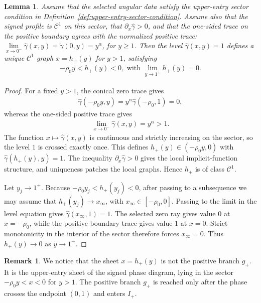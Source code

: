 \documentclass{amsart}
\theoremstyle{plain}
\newtheorem{lemma}[theorem]{Lemma}
\theoremstyle{mainintrothm}
\theoremstyle{definition}
\newtheorem{remark}[theorem]{Remark}
\begin{document}
\begin{lemma}
	\label{lem:upper-entry-sheet-from-zero-sector}
	Assume that the selected angular data satisfy the upper-entry sector
	condition in Definition~\ref{def:upper-entry-sector-condition}.  Assume also that the signed profile is $\mathcal C^1$ on this
	sector, that $\partial_x\widehat\gamma>0$, and that the one-sided trace on
	the positive boundary agrees with the normalized positive trace: $\lim\limits_{x\to0^-}\widehat\gamma(x,y)=\widetilde\gamma(0,y)=y^\alpha$, for  $y\ge1$. Then the level $\widehat\gamma(x,y)=1$ defines a unique
	$\mathcal C^1$ graph $x=h_+(y)$ for $y>1$, satisfying
	\begin{align*}
		-\rho_0y<h_+(y)<0,
		\mbox{ with }
		\lim\limits_{y\to1^+}h_+(y)=0.
	\end{align*}
\end{lemma}

\begin{proof}
	For a fixed $y>1$, the conical zero trace gives
	\begin{align*}
		\widehat\gamma(-\rho_0y,y)
		=
		y^\alpha\widehat\gamma(-\rho_0,1)
		=
		0,
	\end{align*}
	whereas the one-sided positive trace gives
	\begin{align*}
		\lim\limits_{x\to0^-}\widehat\gamma(x,y)
		=
		y^\alpha
		>
		1.
	\end{align*}
	The function $x\mapsto\widehat\gamma(x,y)$ is continuous and strictly
	increasing on the sector, so the level $1$ is crossed exactly once.  This
	defines $h_+(y)\in(-\rho_0y,0)$ with
	$\widehat\gamma(h_+(y),y)=1$.  The inequality
	$\partial_x\widehat\gamma>0$ gives the local implicit-function structure, and
	uniqueness patches the local graphs.  Hence $h_+$ is of class $\mathcal C^1$.
	
	\medskip
	
	Let $y_j\to1^+$.  Because $-\rho_0y_j<h_+(y_j)<0$, after passing to a
	subsequence we may assume that $h_+(y_j)\to x_\infty$, with
	$x_\infty\in[-\rho_0,0]$.  Passing to the limit in the level equation gives
	$\widehat\gamma(x_\infty,1)=1$.  The selected zero ray gives value $0$ at
	$x=-\rho_0$, while the positive boundary trace gives value $1$ at $x=0$.
	Strict monotonicity in the interior of the sector therefore forces
	$x_\infty=0$.  Thus $h_+(y)\to0$ as $y\to1^+$.
\end{proof}

\begin{remark}
We notice that the sheet $x=h_+(y)$ is not the positive branch $g_+$.  It is the
upper-entry sheet of the signed phase diagram, lying in the sector
$-\rho_0y<x<0$ for $y>1$.  The positive branch $g_+$ is reached only after
the phase crosses the endpoint $(0,1)$ and enters $I_+$.
\end{remark}
\end{document}
